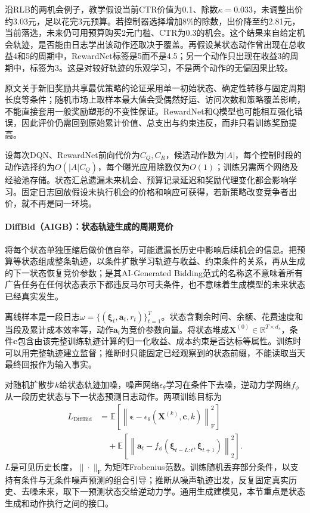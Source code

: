 沿RLB的两机会例子，教学假设当前CTR价值为0.1、除数$\kappa=0.033$，未调整出价约3.03元，足以花完3元预算。若控制器选择增加8\%的除数，出价降至约2.81元，当前落选，未来仍可用预算购买2元门槛、CTR为0.3的机会。这个结果来自给定机会轨迹，是否能由日志学出该动作还取决于覆盖。再假设某状态动作曾出现在总收益4和5的周期中，RewardNet标签是5而不是4.5；另一个动作只出现在收益3的周期中，标签为3。这是对较好轨迹的乐观学习，不是两个动作的无偏因果比较。

原文关于新旧奖励共享最优策略的论证采用单一初始状态、确定性转移与固定周期长度等条件；随机市场上取样本最大值会受偶然好运、访问次数和策略覆盖影响，不能直接套用一般奖励塑形的不变性保证。RewardNet和Q模型也可能相互强化错误，因此评价仍需回到原始累计价值、总支出与约束违反，而非只看训练奖励提高。

设每次DQN、RewardNet前向代价为$C_Q,C_R$，候选动作数为$|A|$，每个控制时段的动作选择约为$O(|A|C_Q)$，每个曝光应用除数仅为$O(1)$；训练另需两个网络及经验池存储。状态汇总遗漏未来机会、预算记录延迟和奖励代理变化都会影响学习。固定日志回放假设未执行机会的价格和响应可获得，若新策略改变竞争者出价，就不再是同一环境。

\paragraph{DiffBid（AIGB）：状态轨迹生成的周期竞价}
\label{sec:rs-advertising-diffbid}

将每个状态单独压缩后做价值自举，可能遗漏长历史中影响后续机会的信息。把预算等状态组成整条轨迹，以条件扩散学习轨迹与收益、约束条件的关系，再从生成的下一状态恢复竞价参数；是其AI-Generated Bidding范式的名称这不意味着所有广告任务在任何状态表示下都违反马尔可夫条件，也不意味着生成模型的未来状态已经真实发生。

离线样本是一段日志$\omega=\{(\bm{\xi}_t,\bm{a}_t,r_t)\}_{t=1}^{T}$。状态含剩余时间、余额、花费速度和当段及累计成本效率等，动作$\bm{a}_t$为竞价参数向量。将状态堆成$\bm{X}^{(0)}\in\mathbb{R}^{T\times d_s}$，条件$\bm{c}$包含由该完整训练轨迹计算的归一化收益、成本约束是否达标等属性。训练时可以用完整轨迹建立监督；推断时只能固定已经观察到的状态前缀，不能读取当天最终回报作为输入事实。

对随机扩散步$k$给状态轨迹加噪，噪声网络$\epsilon_\theta$学习在条件下去噪，逆动力学网络$f_\phi$从一段历史状态与下一状态预测日志动作。两项训练目标为
\begin{equation}
  \begin{aligned}
    L_{\mathrm{DiffBid}}
      &=\mathbb{E}\left[
          \left\|\bm{\epsilon}
            -\epsilon_\theta(\bm{X}^{(k)},\bm{c},k)\right\|_{\mathrm{F}}^2
        \right]\\
      &\quad+\mathbb{E}\left[
         \left\|\bm{a}_t-
           f_\phi(\bm{\xi}_{t-L:t},\bm{\xi}_{t+1})
         \right\|_2^2\right].
  \end{aligned}
  \label{eq:rs-advertising-diffbid}
\end{equation}
$L$是可见历史长度，$\|\cdot\|_{\mathrm{F}}$为矩阵Frobenius范数。训练随机丢弃部分条件，以支持有条件与无条件噪声预测的组合引导；推断从噪声轨迹出发，反复固定真实历史、去噪未来，取下一预测状态交给逆动力学。通用生成建模见，本节重点是状态生成和动作执行之间的接口。

